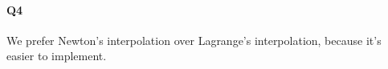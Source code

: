 \documentclass[11pt]{article}
\begin{document}
\paragraph{Q4}
We prefer Newton's interpolation over Lagrange's interpolation, because it's easier to implement.
\begin{figure}[H]
	\centering
\end{figure}

\end{document}
